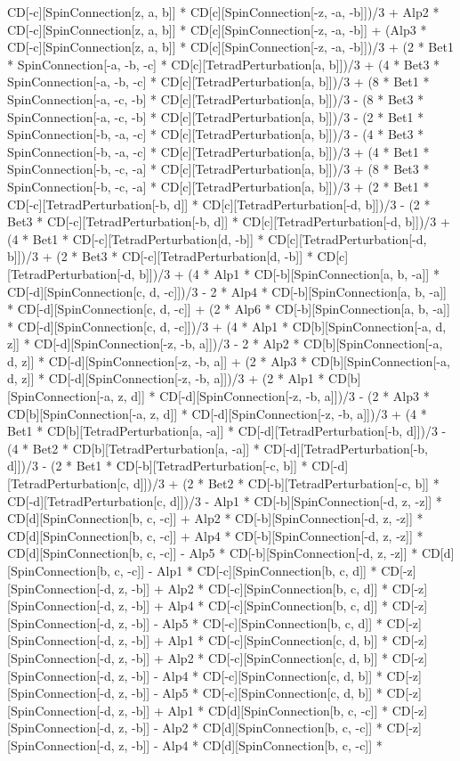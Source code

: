CD[-c][SpinConnection[z, a, b]] * CD[c][SpinConnection[-z, -a, -b]])/3 + Alp2 * CD[-c][SpinConnection[z, a, b]] * CD[c][SpinConnection[-z, -a, -b]] + (Alp3 * CD[-c][SpinConnection[z, a, b]] * CD[c][SpinConnection[-z, -a, -b]])/3 + (2 * Bet1 * SpinConnection[-a, -b, -c] * CD[c][TetradPerturbation[a, b]])/3 + (4 * Bet3 * SpinConnection[-a, -b, -c] * CD[c][TetradPerturbation[a, b]])/3 + (8 * Bet1 * SpinConnection[-a, -c, -b] * CD[c][TetradPerturbation[a, b]])/3 - (8 * Bet3 * SpinConnection[-a, -c, -b] * CD[c][TetradPerturbation[a, b]])/3 - (2 * Bet1 * SpinConnection[-b, -a, -c] * CD[c][TetradPerturbation[a, b]])/3 - (4 * Bet3 * SpinConnection[-b, -a, -c] * CD[c][TetradPerturbation[a, b]])/3 + (4 * Bet1 * SpinConnection[-b, -c, -a] * CD[c][TetradPerturbation[a, b]])/3 + (8 * Bet3 * SpinConnection[-b, -c, -a] * CD[c][TetradPerturbation[a, b]])/3 + (2 * Bet1 * CD[-c][TetradPerturbation[-b, d]] * CD[c][TetradPerturbation[-d, b]])/3 - (2 * Bet3 * CD[-c][TetradPerturbation[-b, d]] * CD[c][TetradPerturbation[-d, b]])/3 + (4 * Bet1 * CD[-c][TetradPerturbation[d, -b]] * CD[c][TetradPerturbation[-d, b]])/3 + (2 * Bet3 * CD[-c][TetradPerturbation[d, -b]] * CD[c][TetradPerturbation[-d, b]])/3 + (4 * Alp1 * CD[-b][SpinConnection[a, b, -a]] * CD[-d][SpinConnection[c, d, -c]])/3 - 2 * Alp4 * CD[-b][SpinConnection[a, b, -a]] * CD[-d][SpinConnection[c, d, -c]] + (2 * Alp6 * CD[-b][SpinConnection[a, b, -a]] * CD[-d][SpinConnection[c, d, -c]])/3 + (4 * Alp1 * CD[b][SpinConnection[-a, d, z]] * CD[-d][SpinConnection[-z, -b, a]])/3 - 2 * Alp2 * CD[b][SpinConnection[-a, d, z]] * CD[-d][SpinConnection[-z, -b, a]] + (2 * Alp3 * CD[b][SpinConnection[-a, d, z]] * CD[-d][SpinConnection[-z, -b, a]])/3 + (2 * Alp1 * CD[b][SpinConnection[-a, z, d]] * CD[-d][SpinConnection[-z, -b, a]])/3 - (2 * Alp3 * CD[b][SpinConnection[-a, z, d]] * CD[-d][SpinConnection[-z, -b, a]])/3 + (4 * Bet1 * CD[b][TetradPerturbation[a, -a]] * CD[-d][TetradPerturbation[-b, d]])/3 - (4 * Bet2 * CD[b][TetradPerturbation[a, -a]] * CD[-d][TetradPerturbation[-b, d]])/3 - (2 * Bet1 * CD[-b][TetradPerturbation[-c, b]] * CD[-d][TetradPerturbation[c, d]])/3 + (2 * Bet2 * CD[-b][TetradPerturbation[-c, b]] * CD[-d][TetradPerturbation[c, d]])/3 - Alp1 * CD[-b][SpinConnection[-d, z, -z]] * CD[d][SpinConnection[b, c, -c]] + Alp2 * CD[-b][SpinConnection[-d, z, -z]] * CD[d][SpinConnection[b, c, -c]] + Alp4 * CD[-b][SpinConnection[-d, z, -z]] * CD[d][SpinConnection[b, c, -c]] - Alp5 * CD[-b][SpinConnection[-d, z, -z]] * CD[d][SpinConnection[b, c, -c]] - Alp1 * CD[-c][SpinConnection[b, c, d]] * CD[-z][SpinConnection[-d, z, -b]] + Alp2 * CD[-c][SpinConnection[b, c, d]] * CD[-z][SpinConnection[-d, z, -b]] + Alp4 * CD[-c][SpinConnection[b, c, d]] * CD[-z][SpinConnection[-d, z, -b]] - Alp5 * CD[-c][SpinConnection[b, c, d]] * CD[-z][SpinConnection[-d, z, -b]] + Alp1 * CD[-c][SpinConnection[c, d, b]] * CD[-z][SpinConnection[-d, z, -b]] + Alp2 * CD[-c][SpinConnection[c, d, b]] * CD[-z][SpinConnection[-d, z, -b]] - Alp4 * CD[-c][SpinConnection[c, d, b]] * CD[-z][SpinConnection[-d, z, -b]] - Alp5 * CD[-c][SpinConnection[c, d, b]] * CD[-z][SpinConnection[-d, z, -b]] + Alp1 * CD[d][SpinConnection[b, c, -c]] * CD[-z][SpinConnection[-d, z, -b]] - Alp2 * CD[d][SpinConnection[b, c, -c]] * CD[-z][SpinConnection[-d, z, -b]] - Alp4 * CD[d][SpinConnection[b, c, -c]] * 
